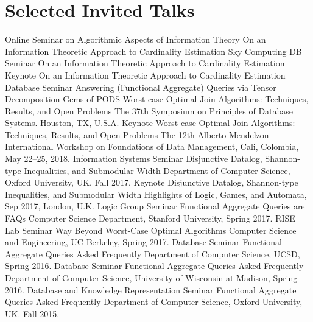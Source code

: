 \documentclass[10pt]{moderncv}
\begin{document}
\section{Selected Invited Talks}
{Online Seminar on Algorithmic Aspects of Information Theory}
{On an Information Theoretic Approach to Cardinality Estimation}
{}{}
{}
{Sky Computing DB Seminar}
{On an Information Theoretic Approach to Cardinality Estimation}
{}{}
{}
{Keynote}
{On an Information Theoretic Approach to Cardinality Estimation}
{}{}
{}
{Database Seminar}
{Answering (Functional Aggregate) Queries via Tensor Decomposition}
{}{}
{}
{Gems of PODS}
{Worst-case Optimal Join Algorithms: Techniques, Results, and Open Problems}
{}{}
{The 37th Symposium on Principles of Database Systems.  Houston, TX, U.S.A.}
{Keynote}
{Worst-case Optimal Join Algorithms: Techniques, Results, and Open Problems}
{}{}
{The 12th Alberto Mendelzon International Workshop on Foundations of
Data Management, Cali, Colombia, May 22--25, 2018.}
{Information Systems Seminar}
{Disjunctive Datalog, Shannon-type Inequalities, and Submodular Width}
{}{}
{Department of Computer Science, Oxford University, UK. Fall 2017.}
{Keynote}
{Disjunctive Datalog, Shannon-type Inequalities, and Submodular Width}
{}{}
{Highlights of Logic, Games, and Automata, Sep 2017, London, U.K.}
{Logic Group Seminar}
{Functional Aggregate Queries are FAQs}
{}{}
{Computer Science Department, Stanford University, Spring 2017.}
{RISE Lab Seminar}
{Way Beyond Worst-Case Optimal Algorithms}
{}{}
{Computer Science and Engineering, UC Berkeley, Spring 2017.}
{Database Seminar}
{Functional Aggregate Queries Asked Frequently}
{}{}
{Department of Computer Science, UCSD, Spring 2016.}
{Database Seminar}
{Functional Aggregate Queries Asked Frequently}
{}{}
{Department of Computer Science, University of Wisconsin at Madison, Spring
2016.}
{Database and Knowledge Representation Seminar}
{Functional Aggregate Queries Asked Frequently}
{}{}
{Department of Computer Science, Oxford University, UK. Fall 2015.}
\end{document}
